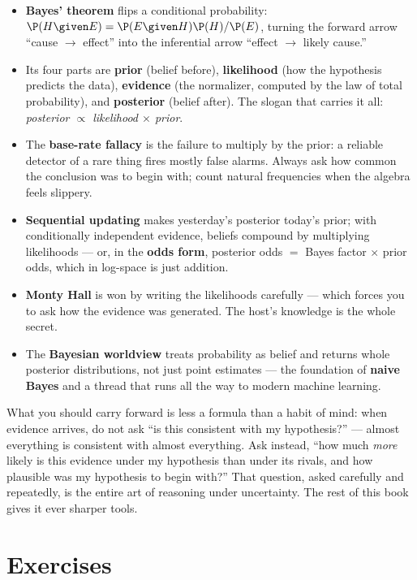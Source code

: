 \begin{itemize}
\item \textbf{Bayes' theorem} flips a conditional probability:
$\P(H\given E) = \P(E\given H)\P(H)/\P(E)$, turning the forward arrow ``cause $\to$
effect'' into the inferential arrow ``effect $\to$ likely cause.''
\item Its four parts are \textbf{prior} (belief before), \textbf{likelihood} (how the
hypothesis predicts the data), \textbf{evidence} (the normalizer, computed by the law of
total probability), and \textbf{posterior} (belief after). The slogan that carries it all:
\emph{posterior $\propto$ likelihood $\times$ prior}.
\item The \textbf{base-rate fallacy} is the failure to multiply by the prior: a reliable
detector of a rare thing fires mostly false alarms. Always ask how common the conclusion
was to begin with; count natural frequencies when the algebra feels slippery.
\item \textbf{Sequential updating} makes yesterday's posterior today's prior; with
conditionally independent evidence, beliefs compound by multiplying likelihoods --- or,
in the \textbf{odds form}, posterior odds $=$ Bayes factor $\times$ prior odds, which in
log-space is just addition.
\item \textbf{Monty Hall} is won by writing the likelihoods carefully --- which forces you to ask
how the evidence was generated. The host's knowledge is the whole secret.
\item The \textbf{Bayesian worldview} treats probability as belief and returns whole
posterior distributions, not just point estimates --- the foundation of \textbf{naive
Bayes} and a thread that runs all the way to modern machine learning.
\end{itemize}

What you should carry forward is less a formula than a habit of mind: when evidence
arrives, do not ask ``is this consistent with my hypothesis?'' --- almost everything is
consistent with almost everything. Ask instead, ``how much \emph{more} likely is this
evidence under my hypothesis than under its rivals, and how plausible was my hypothesis to
begin with?'' That question, asked carefully and repeatedly, is the entire art of reasoning
under uncertainty. The rest of this book gives it ever sharper tools.

\section{Exercises}
\label{ch05:exercises}

